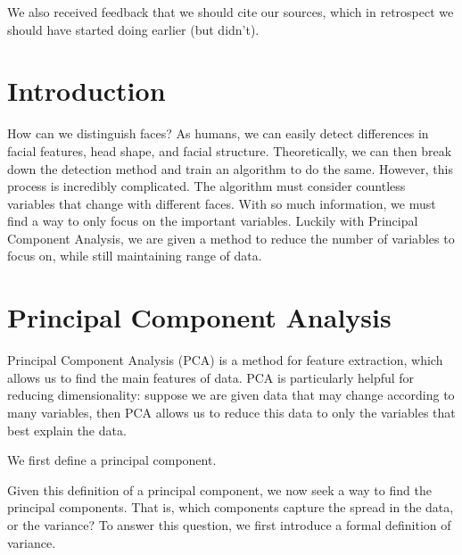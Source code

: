 \documentclass{article}
\begin{document}
We also received feedback that we should cite our sources, which in retrospect we should have started doing earlier (but didn't).


\pagebreak

\section{Introduction}
How can we distinguish faces? As humans, we can easily detect differences in facial features, head shape, and facial structure. Theoretically, we can then break down the detection method and train an algorithm to do the same. However, this process is incredibly complicated. The algorithm must consider countless variables that change with different faces. With so much information, we must find a way to only focus on the important variables. Luckily with Principal Component Analysis, we are given a method to reduce the number of variables to focus on, while still maintaining range of data. 

\section{Principal Component Analysis}
Principal Component Analysis (PCA) is a method for feature extraction, which allows us to find the main features of data. PCA is particularly helpful for reducing dimensionality: suppose we are given data that may change according to many variables, then PCA allows us to reduce this data to only the variables that best explain the data. 

\vspace{2mm}
\noindent We first define a principal component.

\vspace{3mm}

\noindent{}

\vspace{3mm}
\noindent Given this definition of a principal component, we now seek a way to find the principal components. That is, which components capture the spread in the data, or the variance? To answer this question, we first introduce a formal definition of variance.

\vspace{3mm}
\end{document}

